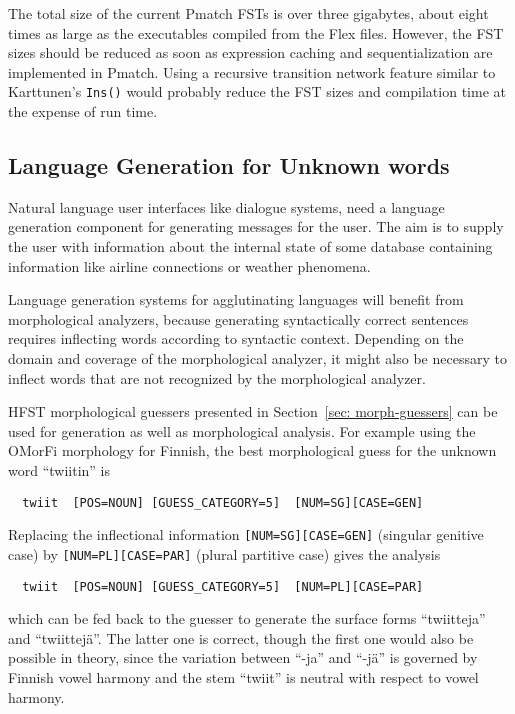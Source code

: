 \documentclass{llncs}
\begin{document}
The total size of the current Pmatch
FSTs is over three gigabytes, about eight times as large as the
executables compiled from the Flex files. However, the FST sizes
should be reduced as soon as expression caching and sequentialization
are implemented in Pmatch. Using a recursive transition network
feature similar to Karttunen's \cite{karttunen/2011} \texttt{Ins()}
would probably reduce the FST sizes and compilation time at the
expense of run time.

\subsection{Language Generation for Unknown words}
\label{sec:morph-generation}
Natural language user interfaces like dialogue systems, need a
language generation component for generating messages for the
user. The aim is to supply the user with information about the
internal state of some database containing information like airline
connections or weather phenomena.

Language generation systems for agglutinating languages will benefit
from morphological analyzers, because generating syntactically correct
sentences requires inflecting words according to syntactic
context. Depending on the domain and coverage of the morphological
analyzer, it might also be necessary to inflect words that are not
recognized by the morphological analyzer. 

HFST morphological guessers presented in Section~\ref{sec:
  morph-guessers} can be used for generation as well as morphological
analysis. For example using the OMorFi morphology for Finnish, the
best morphological guess for the unknown word ``twiitin'' is
\begin{verbatim}
  twiit  [POS=NOUN] [GUESS_CATEGORY=5]  [NUM=SG][CASE=GEN]
\end{verbatim}
Replacing the inflectional information {\tt [NUM=SG][CASE=GEN]}
(singular genitive case) by {\tt [NUM=PL][CASE=PAR]} (plural
partitive case) gives the analysis
\begin{verbatim}
  twiit  [POS=NOUN] [GUESS_CATEGORY=5]  [NUM=PL][CASE=PAR]
\end{verbatim}
which can be fed back to the guesser to generate the surface forms
``twiitteja'' and ``twiittejä''. The latter one is correct, though the
first one would also be possible in theory, since the variation
between ``-ja'' and ``-jä'' is governed by Finnish vowel harmony and
the stem ``twiit'' is neutral with respect to vowel harmony.
\end{document}
